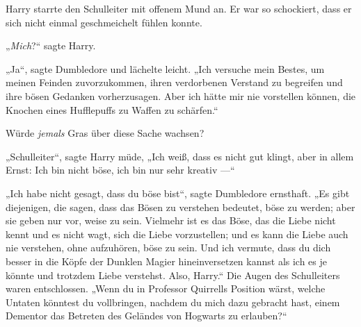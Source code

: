 Harry starrte den Schulleiter mit offenem Mund an. Er war so schockiert, dass er sich nicht einmal geschmeichelt fühlen konnte.

„\emph{Mich}?“ sagte Harry.

„Ja“, sagte Dumbledore und lächelte leicht.
„Ich versuche mein Bestes, um meinen Feinden zuvorzukommen, ihren verdorbenen Verstand zu begreifen und ihre bösen Gedanken vorherzusagen. Aber ich hätte mir nie vorstellen können, die Knochen eines Hufflepuffs zu Waffen zu schärfen.“

Würde \emph{jemals} Gras über diese Sache wachsen?

„Schulleiter“, sagte Harry müde,
„Ich weiß, dass es nicht gut klingt, aber in allem Ernst: Ich bin nicht böse, ich bin nur sehr kreativ —“

„Ich habe nicht gesagt, dass du böse bist“, sagte Dumbledore ernsthaft.
„Es gibt diejenigen, die sagen, dass das Bösen zu verstehen bedeutet, böse zu werden; aber sie geben nur vor, weise zu sein. Vielmehr ist es das Böse, das die Liebe nicht kennt und es nicht wagt, sich die Liebe vorzustellen; und es kann die Liebe auch nie verstehen, ohne aufzuhören, böse zu sein. Und ich vermute, dass du dich besser in die Köpfe der Dunklen Magier hineinversetzen kannst als ich es je könnte und trotzdem Liebe verstehst. Also, Harry.“ Die Augen des Schulleiters waren entschlossen.
„Wenn du in Professor Quirrells Position wärst, welche Untaten könntest du vollbringen, nachdem du mich dazu gebracht hast, einem Dementor das Betreten des Geländes von Hogwarts zu erlauben?“

